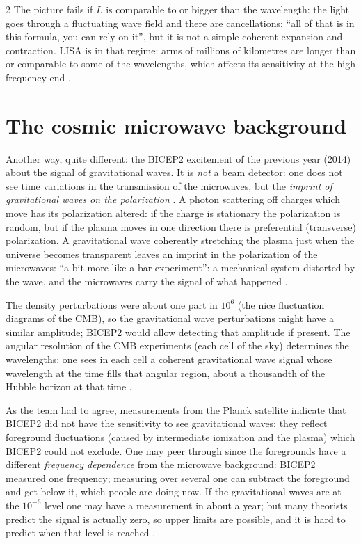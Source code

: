 \begin{paracol}{2}
The picture fails if $L$ is comparable to or bigger than the wavelength: the light goes through a fluctuating wave field and there are cancellations; ``all of that is in this formula, you can rely on it'', but it is not a simple coherent expansion and contraction. LISA is in that regime: arms of millions of kilometres are longer than or comparable to some of the wavelengths, which affects its sensitivity at the high frequency end .

\section{The cosmic microwave background}\label{sec:c28-cmb}

Another way, quite different: the BICEP2 excitement of the previous year (2014) about the signal of gravitational waves. It is \emph{not} a beam detector: one does not see time variations in the transmission of the microwaves, but the \emph{imprint of gravitational waves on the polarization} . A photon scattering off charges which move has its polarization altered: if the charge is stationary the polarization is random, but if the plasma moves in one direction there is preferential (transverse) polarization. A gravitational wave coherently stretching the plasma just when the universe becomes transparent leaves an imprint in the polarization of the microwaves: ``a bit more like a bar experiment'': a mechanical system distorted by the wave, and the microwaves carry the signal of what happened .

The density perturbations were about one part in $10^6$ (the nice fluctuation diagrams of the CMB), so the gravitational wave perturbations might have a similar amplitude; BICEP2 would allow detecting that amplitude if present. The angular resolution of the CMB experiments (each cell of the sky) determines the wavelengths: one sees in each cell a coherent gravitational wave signal whose wavelength at the time fills that angular region, about a thousandth of the Hubble horizon at that time .

As the team had to agree, measurements from the Planck satellite indicate that BICEP2 did not have the sensitivity to see gravitational waves: they reflect foreground fluctuations (caused by intermediate ionization and the plasma) which BICEP2 could not exclude. One may peer through since the foregrounds have a different \emph{frequency dependence} from the microwave background: BICEP2 measured one frequency; measuring over several one can subtract the foreground and get below it, which people are doing now. If the gravitational waves are at the $10^{-6}$ level one may have a measurement in about a year; but many theorists predict the signal is actually zero, so upper limits are possible, and it is hard to predict when that level is reached .


\end{paracol}
